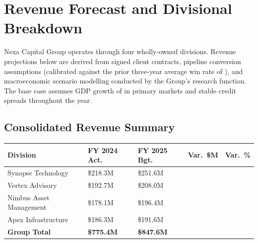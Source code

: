 
\section{Revenue Forecast and Divisional Breakdown}

Nexa Capital Group operates through four wholly-owned divisions.
Revenue projections below are derived from signed client contracts, pipeline
conversion assumptions (calibrated against the prior three-year average win rate
of ), and macroeconomic scenario modelling conducted by the Group's
research function. The base case assumes GDP growth of  in primary
markets and stable credit spreads throughout the year.

\subsection{Consolidated Revenue Summary}

\vspace{4pt}
\begin{center}
\renewcommand{\arraystretch}{1.38}
\begin{tabular}{L{4.2cm} R{2.2cm} R{2.2cm} R{1.8cm} R{2.0cm}}
  \toprule
  \color{white}\textbf{Division} &
  \color{white}\textbf{FY 2024 Act.} &
  \color{white}\textbf{FY 2025 Bgt.} &
  \color{white}\textbf{Var.\ \$M} &
  \color{white}\textbf{Var.\ \%} \\
  \midrule
  Synapse Technology     & \$218.3M & \$251.6M &  &  \\
  Vertex Advisory        & \$192.7M & \$208.0M &  &   \\
  Nimbus Asset Management & \$178.1M & \$196.4M &  &  \\
  Apex Infrastructure    & \$186.3M & \$191.6M &   &   \\
  \midrule
  \textbf{Group Total}   & \textbf{\$775.4M} & \textbf{\$847.6M} &  &  \\
  \bottomrule
\end{tabular}
\end{center}

\vspace{8pt}


